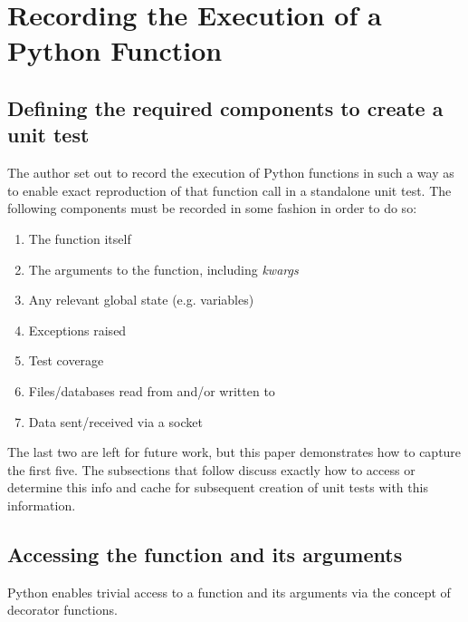 \section{Recording the Execution of a Python Function}\label{sec:approach}

\subsection{Defining the required components to create a unit test}\label{sec:intro-1}

The author set out to record the execution of Python functions
in such a way as to enable exact reproduction of that 
function call in a standalone unit test.  The following components
must be recorded in some fashion in order to do so:
\begin{enumerate}
  \item The function itself
  \item The arguments to the function, including \textit{kwargs}
  \item Any relevant global state (e.g. variables)
  \item Exceptions raised
  \item Test coverage
  \item Files/databases read from and/or written to
  \item Data sent/received via a socket
\end{enumerate}

The last two are left for future work, but this paper demonstrates how to capture 
the first five. The subsections that follow discuss exactly how to 
access or determine this info and cache for subsequent creation of unit tests
with this information.
\subsection{Accessing the function and its arguments}\label{sec:approach-internal-1}

Python enables trivial access to a function and 
its arguments via the concept of decorator functions.

